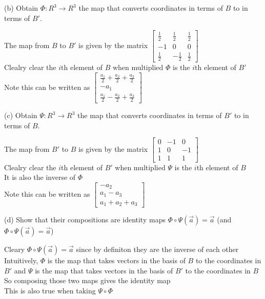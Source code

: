 \documentclass[answers,12pt,addpoints]{exam}
\begin{document}
(b) Obtain $\Phi:R^3\to R^3$ the map that converts coordinates in terms of $B$ to in terms of $B'$.
\begin{solution}
    The map from $B$ to $B'$ is given by the matrix 
    $\begin{bmatrix} 
        \frac{1}{2} & \frac{1}{2} & \frac{1}{2} \\
        -1 & 0 & 0\\
        \frac{1}{2} & -\frac{1}{2} & \frac{1}{2}
    \end{bmatrix}$\\
    Clealry clear the $i$th element of $B$ when multiplied $\Phi$ is the $i$th element of $B'$\\
    Note this can be written as 
    $\begin{bmatrix}
        \frac{a_1}{2} + \frac{a_2}{2} + \frac{a_3}{2} \\
        -a_1 \\
        \frac{a_1}{2} - \frac{a_2}{2} + \frac{a_3}{2}
    \end{bmatrix}$
\end{solution}
(c) Obtain $\Psi:R^3\to R^3$ the map that converts coordinates in terms of $B'$ to in terms of $B$.
\begin{solution}
    The map from $B'$ to $B$ is given by the matrix 
    $\begin{bmatrix} 
        0 & -1 & 0 \\
        1 & 0 & -1\\
        1 & 1 & 1
    \end{bmatrix}$\\
    Clealry clear the $i$th element of $B'$ when multiplied $\Psi$ is the $i$th element of $B$\\
    It is also the inverse of $\Phi$\\
    Note this can be written as
    $\begin{bmatrix}
        -a_2 \\
        a_1-a_3 \\
        a_1+a_2+a_3
    \end{bmatrix}$
\end{solution}

(d) Show that their compositions are identity maps $\Phi\circ\Psi(\vec a)=\vec a$ (and $\Phi\circ\Psi(\vec a)=\vec a$)
\begin{solution}
    Cleary $\Phi\circ\Psi(\vec a)=\vec a$ since by definiton they are the inverse of each other\\
    Intuitively, $\Phi$ is the map that takes vectors in the basis of $B$ to the coordinates in $B'$ and $\Psi$ is the map that takes vectors in the basis of $B'$ to the coordinates in $B$\\
    So composing those two maps gives the identity map\\
    This is also true when taking $\Psi\circ\Phi$\\
\end{solution}
\end{document}
